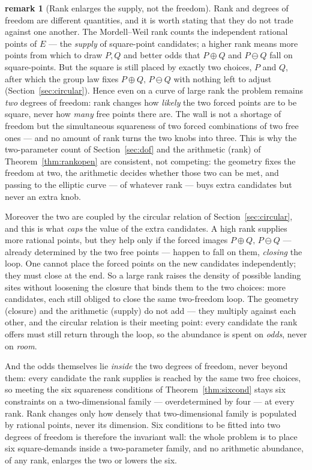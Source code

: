 \documentclass[11pt]{article}
\theoremstyle{definition}
\newtheorem{remark}{remark}
\begin{document}
\begin{remark}[Rank enlarges the supply, not the freedom]\label{rem:rankdof}
Rank and degrees of freedom are different quantities, and it is worth stating that they
do not trade against one another. The Mordell--Weil rank counts the independent rational
points of $E$ --- the \emph{supply} of square-point candidates; a higher rank means more
points from which to draw $P,Q$ and better odds that $P\oplus Q$ and $P\ominus Q$ fall on
square-points. But the square is still placed by exactly two choices, $P$ and $Q$, after
which the group law fixes $P\oplus Q,\,P\ominus Q$ with nothing left to adjust
(Section~\ref{sec:circular}). Hence even on a curve of large rank the problem remains
\emph{two} degrees of freedom: rank changes how \emph{likely} the two forced points are
to be square, never how \emph{many} free points there are. The wall is not a shortage of
freedom but the simultaneous squareness of two forced combinations of two free ones ---
and no amount of rank turns the two knobs into three. This is why the two-parameter count
of Section~\ref{sec:dof} and the arithmetic (rank) of Theorem~\ref{thm:rankopen} are
consistent, not competing: the geometry fixes the freedom at two, the arithmetic decides
whether those two can be met, and passing to the elliptic curve --- of whatever rank ---
buys extra candidates but never an extra knob.

Moreover the two are coupled by the circular relation of Section~\ref{sec:circular}, and
this is what \emph{caps} the value of the extra candidates. A high rank supplies more
rational points, but they help only if the forced images $P\oplus Q,\,P\ominus Q$ ---
already determined by the two free points --- happen to fall on them, \emph{closing} the
loop. One cannot place the forced points on the new candidates independently; they must
close at the end. So a large rank raises the density of possible landing sites without
loosening the closure that binds them to the two choices: more candidates, each still
obliged to close the same two-freedom loop. The geometry (closure) and the arithmetic
(supply) do not add --- they multiply against each other, and the circular relation is
their meeting point: every candidate the rank offers must still return through the loop,
so the abundance is spent on \emph{odds}, never on \emph{room}.

And the odds themselves lie \emph{inside} the two degrees of freedom, never beyond them:
every candidate the rank supplies is reached by the same two free choices, so meeting the
six squareness conditions of Theorem~\ref{thm:sixcond} stays six constraints on a
two-dimensional family --- overdetermined by four --- at every rank. Rank changes only how
densely that two-dimensional family is populated by rational points, never its dimension.
Six conditions to be fitted into two degrees of freedom is therefore the invariant wall:
the whole problem is to place six square-demands inside a two-parameter family, and no
arithmetic abundance, of any rank, enlarges the two or lowers the six.
\end{remark}
\end{document}
